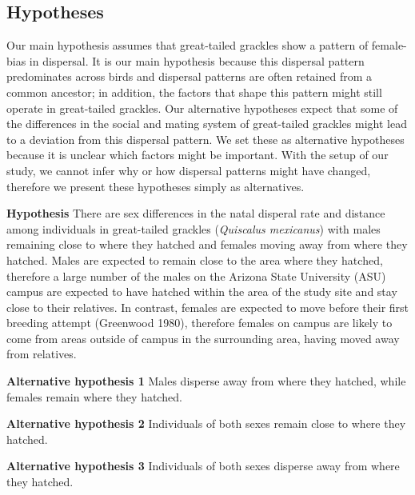 \documentclass[
]{article}
\begin{document}
\hypertarget{hypotheses}{%
\subsection{Hypotheses}\label{hypotheses}}

Our main hypothesis assumes that great-tailed grackles show a pattern of
female-bias in dispersal. It is our main hypothesis because this
dispersal pattern predominates across birds and dispersal patterns are
often retained from a common ancestor; in addition, the factors that
shape this pattern might still operate in great-tailed grackles. Our
alternative hypotheses expect that some of the differences in the social
and mating system of great-tailed grackles might lead to a deviation
from this dispersal pattern. We set these as alternative hypotheses
because it is unclear which factors might be important. With the setup
of our study, we cannot infer why or how dispersal patterns might have
changed, therefore we present these hypotheses simply as alternatives.

\textbf{Hypothesis} There are sex differences in the natal disperal rate
and distance among individuals in great-tailed grackles (\emph{Quiscalus
mexicanus}) with males remaining close to where they hatched and females
moving away from where they hatched. Males are expected to remain close
to the area where they hatched, therefore a large number of the males on
the Arizona State University (ASU) campus are expected to have hatched
within the area of the study site and stay close to their relatives. In
contrast, females are expected to move before their first breeding
attempt (Greenwood 1980), therefore females on campus are likely to come
from areas outside of campus in the surrounding area, having moved away
from relatives.

\textbf{Alternative hypothesis 1} Males disperse away from where they
hatched, while females remain where they hatched.

\textbf{Alternative hypothesis 2} Individuals of both sexes remain close
to where they hatched.

\textbf{Alternative hypothesis 3} Individuals of both sexes disperse
away from where they hatched.
\end{document}
